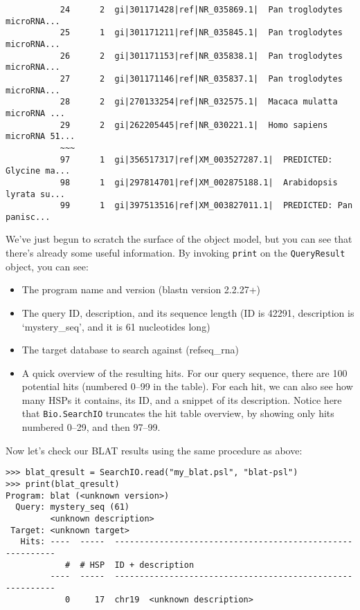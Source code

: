 \begin{verbatim}
           24      2  gi|301171428|ref|NR_035869.1|  Pan troglodytes microRNA...
           25      1  gi|301171211|ref|NR_035845.1|  Pan troglodytes microRNA...
           26      2  gi|301171153|ref|NR_035838.1|  Pan troglodytes microRNA...
           27      2  gi|301171146|ref|NR_035837.1|  Pan troglodytes microRNA...
           28      2  gi|270133254|ref|NR_032575.1|  Macaca mulatta microRNA ...
           29      2  gi|262205445|ref|NR_030221.1|  Homo sapiens microRNA 51...
           ~~~
           97      1  gi|356517317|ref|XM_003527287.1|  PREDICTED: Glycine ma...
           98      1  gi|297814701|ref|XM_002875188.1|  Arabidopsis lyrata su...
           99      1  gi|397513516|ref|XM_003827011.1|  PREDICTED: Pan panisc...
\end{verbatim}

We've just begun to scratch the surface of the object model, but you can see that
there's already some useful information. By invoking \verb|print| on the
\verb|QueryResult| object, you can see:

\begin{itemize}
\item The program name and version (blastn version 2.2.27+)
\item The query ID, description, and its sequence length (ID is 42291,
    description is `mystery\_seq', and it is 61 nucleotides long)
\item The target database to search against (refseq\_rna)
\item A quick overview of the resulting hits. For our query sequence, there are
    100 potential hits (numbered 0--99 in the table). For each hit, we can also see
    how many HSPs it contains, its ID, and a snippet of its description. Notice
    here that \verb|Bio.SearchIO| truncates the hit table overview, by showing
    only hits numbered 0--29, and then 97--99.
\end{itemize}

Now let's check our BLAT results using the same procedure as above:

\begin{verbatim}
>>> blat_qresult = SearchIO.read("my_blat.psl", "blat-psl")
>>> print(blat_qresult)
Program: blat (<unknown version>)
  Query: mystery_seq (61)
         <unknown description>
 Target: <unknown target>
   Hits: ----  -----  ----------------------------------------------------------
            #  # HSP  ID + description
         ----  -----  ----------------------------------------------------------
            0     17  chr19  <unknown description>
\end{verbatim}

